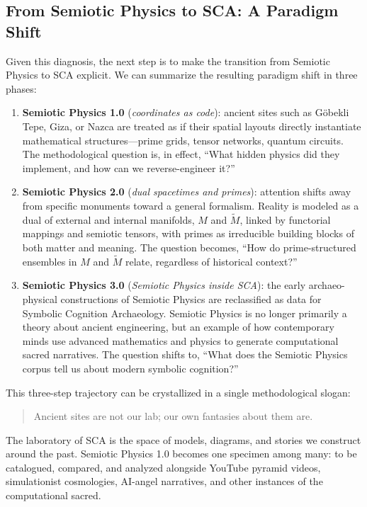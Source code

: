 \documentclass[12]{amsart}
\theoremstyle{plain}
\begin{document}
\subsection{From Semiotic Physics to SCA: A Paradigm Shift}

Given this diagnosis, the next step is to make the transition from Semiotic Physics to SCA explicit. We can summarize the resulting paradigm shift in three phases:

\begin{enumerate}
  \item \textbf{Semiotic Physics 1.0} (\emph{coordinates as code}): ancient sites such as Göbekli Tepe, Giza, or Nazca are treated as if their spatial layouts directly instantiate mathematical structures---prime grids, tensor networks, quantum circuits. The methodological question is, in effect, ``What hidden physics did they implement, and how can we reverse-engineer it?''
  \item \textbf{Semiotic Physics 2.0} (\emph{dual spacetimes and primes}): attention shifts away from specific monuments toward a general formalism. Reality is modeled as a dual of external and internal manifolds, $M$ and $\tilde M$, linked by functorial mappings and semiotic tensors, with primes as irreducible building blocks of both matter and meaning. The question becomes, ``How do prime-structured ensembles in $M$ and $\tilde M$ relate, regardless of historical context?''
  \item \textbf{Semiotic Physics 3.0} (\emph{Semiotic Physics inside SCA}): the early archaeo-physical constructions of Semiotic Physics are reclassified as data for Symbolic Cognition Archaeology. Semiotic Physics is no longer primarily a theory about ancient engineering, but an example of how contemporary minds use advanced mathematics and physics to generate computational sacred narratives. The question shifts to, ``What does the Semiotic Physics corpus tell us about modern symbolic cognition?''
\end{enumerate}

This three-step trajectory can be crystallized in a single methodological slogan:
\begin{quote}
Ancient sites are not our lab; our own fantasies about them are.
\end{quote}
The laboratory of SCA is the space of models, diagrams, and stories we construct around the past. Semiotic Physics 1.0 becomes one specimen among many: to be catalogued, compared, and analyzed alongside YouTube pyramid videos, simulationist cosmologies, AI-angel narratives, and other instances of the computational sacred.
\end{document}
